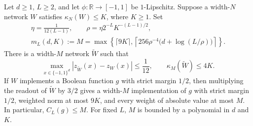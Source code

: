 \begin{theorem}[Compression]\label{thm:compression}
Let $d\geq1$, $L\geq2$, and let $\phi:\mathbb R\to[-1,1]$ be
$1$-Lipschitz. Suppose a width-$N$ network $W$ satisfies
$\kappa_N(W)\leq K$, where $K\geq1$. Set
\begin{equation}\label{eq:compression-parameters}
 \begin{gathered}
 \eta=\frac{1}{12(L-1)},\qquad
 \rho=\eta 2^{-L}K^{-(L-1)/2},\\
 m_L(d,K):=M=\max\left\{\lceil9K\rceil,
 \left\lceil256\rho^{-4}\bigl(d+\log(L/\rho)\bigr)\right\rceil\right\}.
 \end{gathered}
\end{equation}
There is a width-$M$ network $\widetilde W$ such that
\begin{equation}\label{eq:compression-conclusion}
 \max_{x\in\{-1,1\}^d}
 |z_{\widetilde W}(x)-z_W(x)|\leq\frac1{12},
 \qquad \kappa_M(\widetilde W)\leq4K.
\end{equation}
If $W$ implements a Boolean function $g$ with strict margin $1/2$,
then multiplying the readout of $\widetilde W$ by $3/2$ gives a
width-$M$ implementation of $g$ with strict margin $1/2$,
weighted norm at most $9K$, and every weight of absolute value at most
$M$. In particular, $C_L(g)\leq M$. For fixed $L$, $M$ is bounded by a
polynomial in $d$ and $K$.
\end{theorem}

